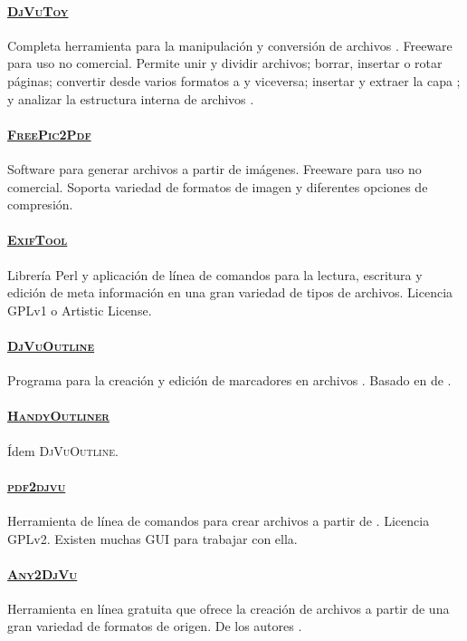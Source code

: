 \documentclass[%
	a5paper,
	10pt,
	twoside,
	openright,
	final,
]{memoir}
\begin{document}
	\paragraph{\href{http://www.cnblogs.com/stronghorse/}{\textsc{DjVuToy}}} Completa herramienta para la manipulación y conversión de archivos \djvu. Freeware para uso no comercial. Permite unir y dividir archivos; borrar, insertar o rotar páginas; convertir desde varios formatos a \djvu y viceversa; insertar y extraer la capa \ocr; y analizar la estructura interna de archivos \djvu.
	\paragraph{\href{http://www.cnblogs.com/stronghorse/}{\textsc{FreePic2Pdf}}} Software para generar archivos \pdf a partir de imágenes. Freeware para uso no comercial. Soporta variedad de formatos de imagen y diferentes opciones de compresión.
	\paragraph{\href{https://www.sno.phy.queensu.ca/~phil/exiftool/}{\textsc{ExifTool}}}Librería Perl y aplicación de línea de comandos para la lectura, escritura y edición de meta información en una gran variedad de tipos de archivos. Licencia GPLv1 o Artistic License.
	\paragraph{\href{https://sourceforge.net/projects/djvuoutline/}{\textsc{DjVuOutline}}} Programa para la creación y edición de marcadores en archivos \djvu. Basado en  de \djvulibre.
	\paragraph{\href{http://handyoutlinerfo.sourceforge.net/}{\textsc{HandyOutliner}}} Ídem \textsc{DjVuOutline}.
	\paragraph{\href{http://jwilk.net/software/pdf2djvu}{\textsc{pdf2djvu}}} Herramienta de línea de comandos para crear archivos \djvu a partir de \pdf. Licencia GPLv2. Existen muchas GUI para trabajar con ella.
	\paragraph{\href{http://djvu.org/any2djvu/}{\textsc{Any2DjVu}}} Herramienta en línea gratuita que ofrece la creación de archivos \djvu a partir de una gran variedad de formatos de origen. De los autores \djvulibre.
\end{document}
